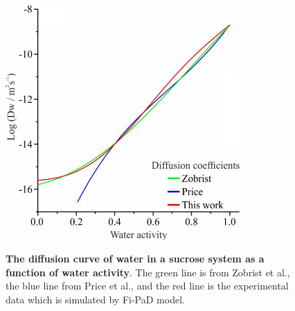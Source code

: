 \begin{figure}
    \centering
    \caption{\textbf{The diffusion curve of water in a sucrose system as a function of water activity}. The green line is from Zobrist et al.\cite{C0CP01273D}, the blue line from Price et al.\cite{Price2014}, and the red line is the experimental data which is simulated by Fi-PaD model.}
    \includegraphics[width=0.8\textwidth]{chapters/water_hopping/figures/image058.png}
    \label{fig:wat_s11}
\end{figure}


